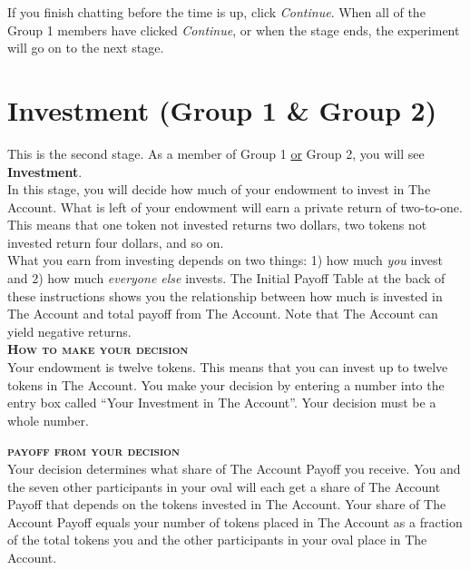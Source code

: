 \documentclass[12pt]{article}
\begin{document}
If you finish chatting before the time is up, click {\em Continue}. When all of the Group 1 members have clicked {\em Continue}, or when the stage ends, the experiment will go on to the next stage.\\  

\section{Investment (Group 1 \& Group 2)}

This is the second stage. As a member of Group 1 \underline{or} Group 2, you will see {\bf Investment}.\\

In this stage, you will decide how much of your endowment to invest in The Account. What is left of your endowment will earn a private return of two-to-one. This means that one token not invested returns two dollars, two tokens not invested return four dollars, and so on.\\ 

What you earn from investing depends on two things: 1) how much {\em you} invest and 2) how much {\em everyone else} invests.  The Initial Payoff Table at the back of these instructions shows you the relationship between how much is invested in The Account and total payoff from The Account. Note that The Account can yield negative returns.\\ 


{\bf \scshape How to make your decision}\\

Your endowment is twelve tokens.  This means that you can invest up to twelve tokens in The Account. You make your decision by entering a number into the entry box called ``Your Investment in The Account''. Your decision must be a whole number.\\ 

\newpage

{\bf \scshape payoff from your decision}\\

Your decision determines what share of The Account Payoff you receive.  You and the seven other participants in your oval will each get a share of The Account Payoff that depends on the tokens invested in The Account.  Your share of The Account Payoff equals your number of tokens placed in The Account as a fraction of the total tokens you and the other participants in your oval place in The Account.\\  
\end{document}
